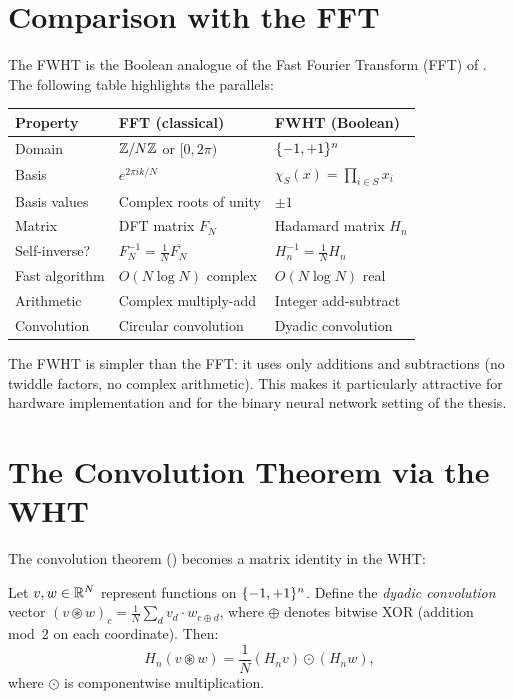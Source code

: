 \section{Comparison with the FFT}\label{sec:fwht-vs-fft}

The FWHT is the Boolean analogue of the Fast Fourier Transform (FFT)
of \citet{cooley1965algorithm}. The following table highlights the
parallels:

\begin{center}
\begin{tabular}{lll}
\toprule
\textbf{Property} & \textbf{FFT (classical)} & \textbf{FWHT (Boolean)} \\
\midrule
Domain & $\mathbb{Z}/N\mathbb{Z}$ or $[0, 2\pi)$ & $\{-1,+1\}^n$ \\
Basis & $e^{2\pi i k/N}$ & $\chi_S(x) = \prod_{i \in S} x_i$ \\
Basis values & Complex roots of unity & $\pm 1$ \\
Matrix & DFT matrix $F_N$ & Hadamard matrix $H_n$ \\
Self-inverse? & $F_N^{-1} = \frac{1}{N}\overline{F_N}$ & $H_n^{-1} = \frac{1}{N} H_n$ \\
Fast algorithm & $O(N \log N)$ complex & $O(N \log N)$ real \\
Arithmetic & Complex multiply-add & Integer add-subtract \\
Convolution & Circular convolution & Dyadic convolution \\
\bottomrule
\end{tabular}
\end{center}

The FWHT is simpler than the FFT: it uses only additions and
subtractions (no twiddle factors, no complex arithmetic). This makes it
particularly attractive for hardware implementation and for the
binary neural network setting of the thesis.


\section{The Convolution Theorem via the WHT}\label{sec:wht-convolution}

The convolution theorem () becomes a matrix
identity in the WHT:

\begin{proposition}\label{prop:wht-convolution}
Let $v, w \in \mathbb{R}^N$ represent functions on $\{-1,+1\}^n$. Define the
\emph{dyadic convolution} vector $(v \circledast w)_c = \frac{1}{N}\sum_{d} v_d \cdot w_{c \oplus d}$,
where $\oplus$ denotes bitwise XOR (addition mod~2 on each coordinate).
Then:
\[
  H_n(v \circledast w) = \frac{1}{N} (H_n v) \odot (H_n w),
\]
where $\odot$ is componentwise multiplication.
\end{proposition}

